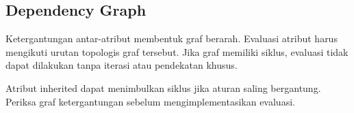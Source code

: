\subsection{Dependency Graph}

Ketergantungan antar-atribut membentuk graf berarah. Evaluasi atribut
harus mengikuti urutan topologis graf tersebut. Jika graf memiliki
siklus, evaluasi tidak dapat dilakukan tanpa iterasi atau
pendekatan khusus.

\begin{warningbox}
Atribut inherited dapat menimbulkan siklus jika aturan saling
bergantung. Periksa graf ketergantungan sebelum mengimplementasikan
evaluasi.
\end{warningbox}
